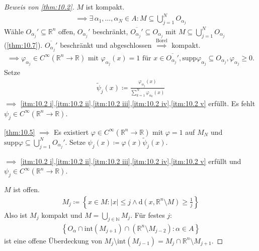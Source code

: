 \begin{proof}[Beweis von \ref{thm:10.2}]
   $M$ ist kompakt.
  \begin{align*}
    \implies \exists \, \alpha_1,\ldots,\alpha_N \in A : M \subseteq \bigcup\limits_{j=1}^{N} O_{\alpha_j}
  \end{align*}
  Wähle $O_{\alpha_j}' \subseteq \mathbb{R}^n$ offen, $O_{\alpha_j}'$ beschränkt, $\overline{O_{\alpha_j}'} \subseteq O_{\alpha_j}$ mit $M \subseteq \bigcup\limits_{j=1}^{N} O_{\alpha_j}$ (\ref{thm:10.7}). $\overline{O_{\alpha_j}'}$ beschränkt und abgeschlossen $\overset{\text{Borel}}{\implies}$ kompakt.
  \begin{multline*}
    \implies \varphi_{\alpha_j} \in C^\infty(\mathbb{R}^n \to \mathbb{R}) \text{ mit } \varphi_{\alpha_j}(x) = 1 \text{ für } x \in \overline{O_{\alpha_j}'}, \mathrm{supp} \varphi_{\alpha_j} \subseteq O_{\alpha_j}, \varphi_{\alpha_j} \geq 0.
  \end{multline*}
  Setze
  \begin{align*}
    \widetilde{\psi}_j(x) \coloneq \frac{\varphi_{\alpha_j}(x)}{\sum\limits_{k=1}^{N} \varphi_{\alpha_k}(x)}
  \end{align*}
  $\implies$ \ref{itm:10.2 i},\ref{itm:10.2 ii},\ref{itm:10.2 iii},\ref{itm:10.2 iv},\ref{itm:10.2 v} erfüllt. Es fehlt $\psi_j \in C^\infty(\mathbb{R}^n \to \mathbb{R})$.
  
  \ref{thm:10.5} $\implies$ Es existiert $\varphi \in C^\infty(\mathbb{R}^n \to \mathbb{R})$ mit $\varphi = 1$ auf $M_N$ und $\mathrm{supp}\varphi \subseteq \bigcup\limits_{j=1}^{N} O_{\alpha_j}'$. Setze $\psi_j(x) \coloneq \varphi(x) \widetilde{\psi}_j(x)$.
  
  $\implies$ \ref{itm:10.2 i},\ref{itm:10.2 ii},\ref{itm:10.2 iii},\ref{itm:10.2 iv},\ref{itm:10.2 v} erfüllt und $\psi_j \in C^\infty(\mathbb{R}^n \to \mathbb{R})$.
  
  
   $M$ ist offen.
  \begin{align*}
    M_j \coloneq \left\{ x \in M : |x| \leq j \land \mathrm{d}(x,\mathbb{R}^n \setminus M) \geq \frac{1}{j} \right\}
  \end{align*}
  Also ist $M_j$ kompakt und $M = \bigcup\limits_{j \in \mathbb{N}} M_j$. Für festes $j$:
  \begin{align*}
    \left\{ O_\alpha \cap \mathrm{int}(M_{j+1}) \cap (\mathbb{R}^n \setminus M_{j-2}) : \alpha \in A \right\}
  \end{align*}
  ist eine offene Überdeckung von $M_j \setminus \mathrm{int}(M_{j-1}) = M_j \cap \mathbb{R}^n \setminus M_{j+1}$.
  

\end{proof}
